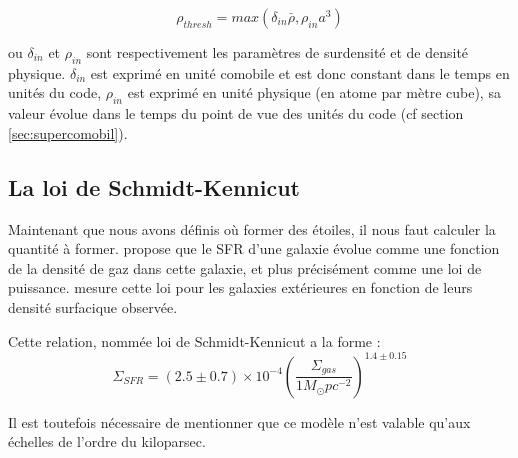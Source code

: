 
\begin{equation}
	\rho_{thresh} = max\left(  \delta_{in} \bar{\rho}, \rho_{in} a^3 \right)
\end{equation} 

ou $\delta_{in}$ et $\rho_{in}$  sont respectivement les paramètres de surdensité et de densité physique.
$\delta_{in}$ est exprimé en unité comobile et est donc constant dans le temps en unités du code,
 $\rho_{in}$ est exprimé en unité physique (en atome par mètre cube), sa valeur évolue dans le temps du point de vue des unités du code (cf section \ref{sec:supercomobil}).


\subsection{La loi de Schmidt-Kennicut}
\label{sec:schmidt-kennicut}

Maintenant que nous avons définis où former des étoiles, il nous faut calculer la quantité à former.
\cite{1959ApJ...129..243S} propose que le \ac{SFR} d'une galaxie évolue comme une fonction de la densité de gaz dans cette galaxie, et plus précisément comme une loi de puissance.
\cite{1998ApJ...498..541K} mesure cette loi pour les galaxies extérieures en fonction de leurs densité surfacique observée.

Cette relation, nommée loi de Schmidt-Kennicut a la forme :
\begin{equation}
\Sigma_{SFR} = (2.5 \pm 0.7) \times 10^{-4} \left( \frac{\Sigma_{gas}}{1 M_\odot pc^{-2}} \right)^{1.4 \pm 0.15}
\end{equation}

Il est toutefois nécessaire de mentionner que ce modèle n'est valable qu'aux échelles de l'ordre du kiloparsec. %

%
%

